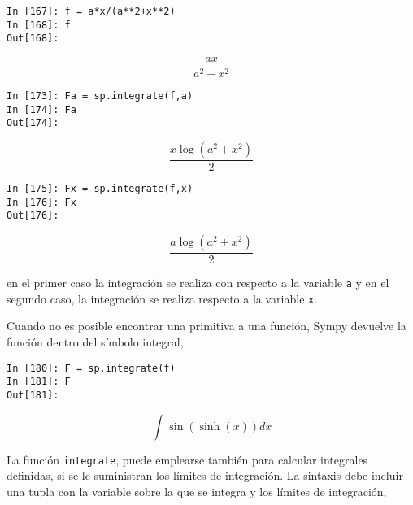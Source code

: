 \begin{center}
	\begin{minipage}{.5\textwidth}
		\begin{verbatim}
In [167]: f = a*x/(a**2+x**2)
In [168]: f
Out[168]: 
		\end{verbatim}
		\begin{equation*}
			\frac{ax}{a^2+x^2}
		\end{equation*}
		\begin{verbatim}
In [173]: Fa = sp.integrate(f,a)
In [174]: Fa
Out[174]: 
		\end{verbatim}
		\begin{equation*}
			\frac{x\log(a^2+x^2)}{2}
		\end{equation*}
				\begin{verbatim}
In [175]: Fx = sp.integrate(f,x)
In [176]: Fx
Out[176]:
		\end{verbatim}
		\begin{equation*}
			\frac{a\log(a^2+x^2)}{2}
		\end{equation*}
	\end{minipage}
\end{center}
\begin{paracol}{2}
en el primer caso la integración se realiza con respecto a la variable \texttt{a} y en el segundo caso, la integración se realiza respecto a la variable \texttt{x}.

Cuando no es posible encontrar una primitiva a una función, Sympy devuelve la función dentro del símbolo integral,
\end{paracol}
\begin{center}
	\begin{minipage}{.5\textwidth}
		\begin{verbatim}
In [180]: F = sp.integrate(f)
In [181]: F
Out[181]:  
		\end{verbatim}
		\begin{equation*}\int \sin(\sinh(x))dx \end{equation*}
	\end{minipage}
\end{center}
\begin{paracol}{2}
La función \texttt{integrate}, puede emplearse también para calcular integrales definidas, si se le suministran los límites de integración. La sintaxis debe incluir una tupla con la variable sobre la que se integra y los límites de integración,
\end{paracol}

